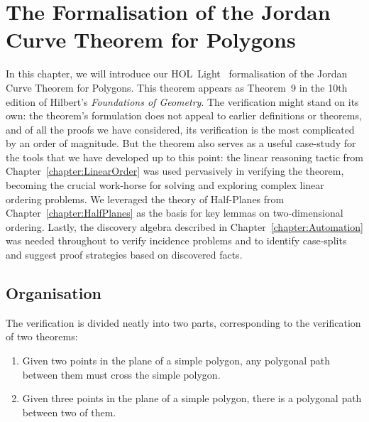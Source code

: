 \chapter{The Formalisation of the Jordan Curve Theorem for Polygons}\label{chapter:JordanFormalisation}\label{chapter:JordanVerification1}

In this chapter, we will introduce our HOL~Light~\cite{HOLLight} formalisation of the Jordan Curve Theorem for Polygons. This theorem appears as Theorem~9 in the 10th edition of Hilbert's \emph{Foundations of Geometry}. The verification might stand on its own: the theorem's formulation does not appeal to earlier definitions or theorems, and of all the proofs we have considered, its verification is the most complicated by an order of magnitude. But the theorem also serves as a useful case-study for the tools that we have developed up to this point: the linear reasoning tactic from Chapter~\ref{chapter:LinearOrder} was used pervasively in verifying the theorem, becoming the crucial work-horse for solving and exploring complex linear ordering problems. We leveraged the theory of Half-Planes from Chapter~\ref{chapter:HalfPlanes} as the basis for key lemmas on two-dimensional ordering. Lastly, the discovery algebra described in Chapter~\ref{chapter:Automation} was needed throughout to verify incidence problems and to identify case-splits and suggest proof strategies based on discovered facts. 

\section{Organisation}
The verification is divided neatly into two parts, corresponding to the verification of two theorems:
\begin{enumerate}
  \item Given two points in the plane of a simple polygon, any polygonal path between them must cross the simple polygon.
  \item Given three points in the plane of a simple polygon, there is a polygonal path between two of them.
\end{enumerate}

